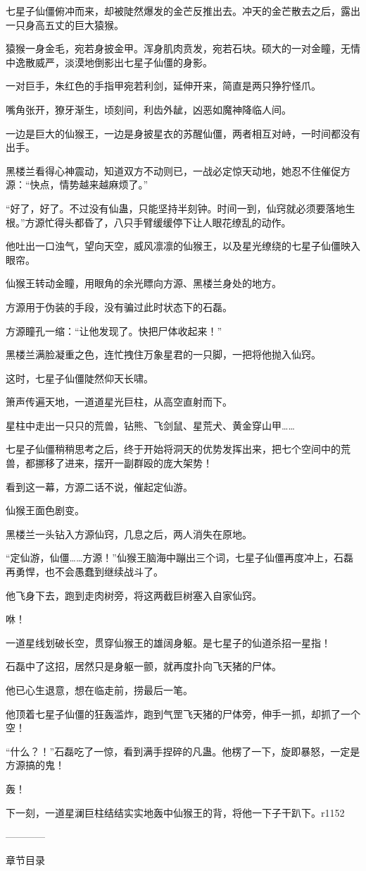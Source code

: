 \begin{this_body}
七星子仙僵俯冲而来，却被陡然爆发的金芒反推出去。冲天的金芒散去之后，露出一只身高五丈的巨大猿猴。

猿猴一身金毛，宛若身披金甲。浑身肌肉贲发，宛若石块。硕大的一对金瞳，无情中逸散威严，淡漠地倒影出七星子仙僵的身影。

一对巨手，朱红色的手指甲宛若利剑，延伸开来，简直是两只狰狞怪爪。

嘴角张开，獠牙渐生，顷刻间，利齿外龇，凶恶如魔神降临人间。

一边是巨大的仙猴王，一边是身披星衣的苏醒仙僵，两者相互对峙，一时间都没有出手。

黑楼兰看得心神震动，知道双方不动则已，一战必定惊天动地，她忍不住催促方源：“快点，情势越来越麻烦了。”

“好了，好了。不过没有仙蛊，只能坚持半刻钟。时间一到，仙窍就必须要落地生根。”方源忙得头都昏了，八只手臂缓缓停下让人眼花缭乱的动作。

他吐出一口浊气，望向天空，威风凛凛的仙猴王，以及星光缭绕的七星子仙僵映入眼帘。

仙猴王转动金瞳，用眼角的余光瞟向方源、黑楼兰身处的地方。

方源用于伪装的手段，没有骗过此时状态下的石磊。

方源瞳孔一缩：“让他发现了。快把尸体收起来！”

黑楼兰满脸凝重之色，连忙拽住万象星君的一只脚，一把将他抛入仙窍。

这时，七星子仙僵陡然仰天长啸。

箫声传遍天地，一道道星光巨柱，从高空直射而下。

星柱中走出一只只的荒兽，钻熊、飞剑鼠、星荒犬、黄金穿山甲……

七星子仙僵稍稍思考之后，终于开始将洞天的优势发挥出来，把七个空间中的荒兽，都挪移了进来，摆开一副群殴的庞大架势！

看到这一幕，方源二话不说，催起定仙游。

仙猴王面色剧变。

黑楼兰一头钻入方源仙窍，几息之后，两人消失在原地。

“定仙游，仙僵……方源！”仙猴王脑海中蹦出三个词，七星子仙僵再度冲上，石磊再勇悍，也不会愚蠢到继续战斗了。

他飞身下去，跑到走肉树旁，将这两截巨树塞入自家仙窍。

咻！

一道星线划破长空，贯穿仙猴王的雄阔身躯。是七星子的仙道杀招一星指！

石磊中了这招，居然只是身躯一颤，就再度扑向飞天猪的尸体。

他已心生退意，想在临走前，捞最后一笔。

他顶着七星子仙僵的狂轰滥炸，跑到气罡飞天猪的尸体旁，伸手一抓，却抓了一个空！

“什么？！”石磊吃了一惊，看到满手捏碎的凡蛊。他楞了一下，旋即暴怒，一定是方源搞的鬼！

轰！

下一刻，一道星澜巨柱结结实实地轰中仙猴王的背，将他一下子干趴下。r1152

------------

章节目录

\end{this_body}

